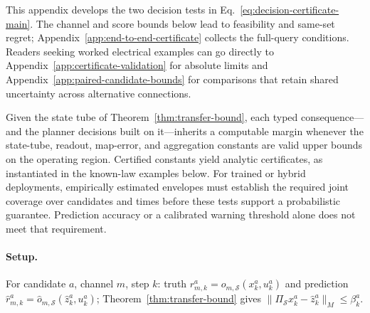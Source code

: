 This appendix develops the two decision tests in
Eq.~\eqref{eq:decision-certificate-main}. The channel and score bounds below
lead to feasibility and same-set regret; Appendix~\ref{app:end-to-end-certificate}
collects the full-query conditions. Readers seeking worked electrical
examples can go directly to Appendix~\ref{app:certificate-validation} for
absolute limits and Appendix~\ref{app:paired-candidate-bounds} for comparisons
that retain shared uncertainty across alternative connections.

Given the state tube of Theorem~\ref{thm:transfer-bound}, each typed consequence---and the planner decisions built on it---inherits a computable margin whenever the state-tube, readout, map-error, and aggregation constants are valid upper bounds on the operating region. Certified constants yield analytic certificates, as instantiated in the known-law examples below. For trained or hybrid deployments, empirically estimated envelopes must establish the required joint coverage over candidates and times before these tests support a probabilistic guarantee. Prediction accuracy or a calibrated warning threshold alone does not meet that requirement.

\paragraph{Setup.}
For candidate $a$, channel $m$, step $k$: truth $r_{m,k}^a=o_{m,\mathcal S}(x_k^a,u_k^a)$ and prediction $\hat r_{m,k}^a=\hat o_{m,\mathcal S}(\hat z_k^a,u_k^a)$; Theorem~\ref{thm:transfer-bound} gives $\lVert\Pi_{\mathcal S}x_k^a-\hat z_k^a\rVert_M\le\beta_k^a$.

